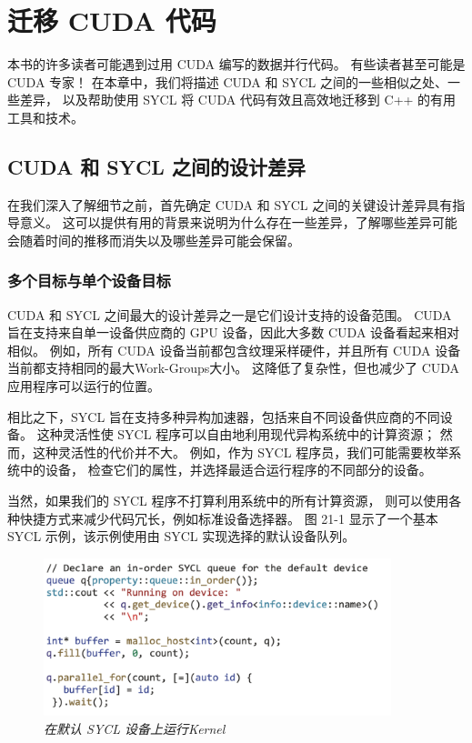 \section{迁移 CUDA 代码}
本书的许多读者可能遇到过用 CUDA 编写的数据并行代码。 
有些读者甚至可能是 CUDA 专家！ 在本章中，我们将描述 CUDA 和 SYCL 之间的一些相似之处、一些差异，
以及帮助使用 SYCL 将 CUDA 代码有效且高效地迁移到 C++ 的有用工具和技术。

\subsection{CUDA 和 SYCL 之间的设计差异}
在我们深入了解细节之前，首先确定 CUDA 和 SYCL 之间的关键设计差异具有指导意义。 
这可以提供有用的背景来说明为什么存在一些差异，了解哪些差异可能会随着时间的推移而消失以及哪些差异可能会保留。

\subsubsection{多个目标与单个设备目标}
CUDA 和 SYCL 之间最大的设计差异之一是它们设计支持的设备范围。 
CUDA 旨在支持来自单一设备供应商的 GPU 设备，因此大多数 CUDA 设备看起来相对相似。 
例如，所有 CUDA 设备当前都包含纹理采样硬件，并且所有 CUDA 设备当前都支持相同的最大Work-Groups大小。 
这降低了复杂性，但也减少了 CUDA 应用程序可以运行的位置。

相比之下，SYCL 旨在支持多种异构加速器，包括来自不同设备供应商的不同设备。 
这种灵活性使 SYCL 程序可以自由地利用现代异构系统中的计算资源； 
然而，这种灵活性的代价并不大。 例如，作为 SYCL 程序员，我们可能需要枚举系统中的设备，
检查它们的属性，并选择最适合运行程序的不同部分的设备。

当然，如果我们的 SYCL 程序不打算利用系统中的所有计算资源，
则可以使用各种快捷方式来减少代码冗长，例如标准设备选择器。 
图 21-1 显示了一个基本 SYCL 示例，该示例使用由 SYCL 实现选择的默认设备队列。

\begin{figure}[H]
	\centering
	\includegraphics[width=0.9\textwidth]{figs/F21.1.png}
	\caption{\textit{在默认 SYCL 设备上运行Kernel }}
\end{figure}

